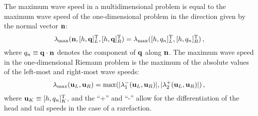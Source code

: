 The maximum wave speed in a multidimensional problem is equal to
the maximum wave speed of the one-dimensional problem in the direction
given by the normal vector $\mathbf{n}$:
\begin{equation}
  \lambda_{\text{max}}(\mathbf{n},
    [h,\mathbf{q}]_L^{\text{T}},
    [h,\mathbf{q}]_R^{\text{T}})
  = 
  \lambda_{\text{max}}(
    [h,q_n]_L^{\text{T}},
    [h,q_n]_R^{\text{T}})
  \,,
\end{equation}
where $q_n\equiv\mathbf{q}\cdot\mathbf{n}$
denotes the component of $\mathbf{q}$ along $\mathbf{n}$.
The maximum wave speed in the one-dimensional Riemann problem
is the maximum of the absolute values of the
left-most and right-most wave speeds:
\begin{equation}\label{eq:maxwavespeed}
  \lambda_{\text{max}}(\mathbf{u}_L, \mathbf{u}_R)
  = \max(|\lambda_1^-(\mathbf{u}_L, \mathbf{u}_R)|
  ,|\lambda_2^+(\mathbf{u}_L, \mathbf{u}_R)|)
  \,,
\end{equation}
where $\mathbf{u}_K\equiv[h,q_n]_K^{\text{T}}$,
and the ``+'' and ``-'' allow for the differentiation of the head
and tail speeds in the case of a rarefaction.


